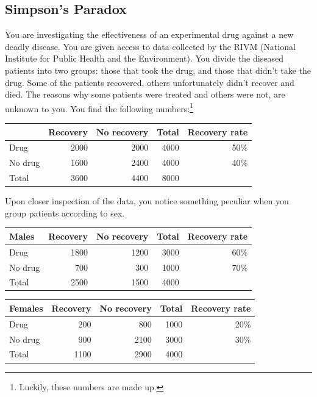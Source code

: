 \subsection{Simpson's Paradox}
You are investigating the effectiveness of an experimental drug against a new deadly disease.
You are given access to data collected by the RIVM (National Institute for Public Health and the Environment). 
You divide the diseased patients into two groups: those that took the drug, and those that didn't take the drug.
Some of the patients recovered, others unfortunately didn't recover and died. 
The reasons why some patients were treated and others were not, are unknown to you.
You find the following numbers:\footnote{Luckily, these numbers are made up.}
\begin{center}\begin{tabular}{l|rr|r|r}
          & Recovery & No recovery & Total & Recovery rate \\
  \hline
  Drug    & 2000       & 2000          & 4000    & 50\%       \\
  No drug & 1600       & 2400          & 4000    & 40\%       \\
  \hline
  Total   & 3600       & 4400          & 8000    &               \\
\end{tabular}\end{center}
Upon closer inspection of the data, you notice something peculiar when you group patients according to sex.
\begin{center}\begin{tabular}{l|rr|r|r}
  Males & Recovery & No recovery & Total & Recovery rate \\
  \hline
  Drug           & 1800       & 1200          & 3000    & 60\%       \\
  No drug        & 700        & 300           & 1000    & 70\%       \\
  \hline
  Total          & 2500       & 1500          & 4000    &               \\
\end{tabular}

\medskip
\begin{tabular}{l|rr|r|r}
  Females & Recovery & No recovery & Total & Recovery rate \\
  \hline
  Drug             & 200        & 800           & 1000    & 20\%       \\
  No drug          & 900        & 2100          & 3000    & 30\%       \\
  \hline
  Total            & 1100       & 2900          & 4000    &               \\
\end{tabular}\end{center}

